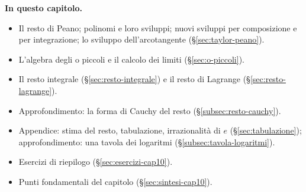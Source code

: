 \medskip
\noindent\textbf{In questo capitolo.}
\begin{itemize}
  \item Il resto di Peano; polinomi e loro sviluppi; nuovi sviluppi per composizione e
  per integrazione; lo sviluppo dell'arcotangente (\S\ref{sec:taylor-peano}).
  \item L'algebra degli o piccoli e il calcolo dei limiti (\S\ref{sec:o-piccoli}).
  \item Il resto integrale (\S\ref{sec:resto-integrale}) e il resto di Lagrange
  (\S\ref{sec:resto-lagrange}).
  \item Approfondimento: la forma di Cauchy del resto (\S\ref{subsec:resto-cauchy}).
  \item Appendice: stima del resto, tabulazione, irrazionalità di $e$
  (\S\ref{sec:tabulazione}); approfondimento: una tavola dei logaritmi
  (\S\ref{subsec:tavola-logaritmi}).
  \item Esercizi di riepilogo (\S\ref{sec:esercizi-cap10}).
  \item Punti fondamentali del capitolo (\S\ref{sec:sintesi-cap10}).
\end{itemize}








